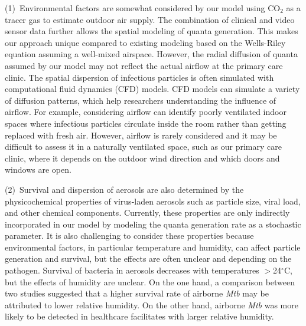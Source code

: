 \documentclass[fleqn,11pt]{wlscirep}
\begin{document}
(1)~Environmental factors are somewhat considered by our model using CO$_2$ as a tracer gas to estimate outdoor air supply. The combination of clinical and video sensor data further allows the spatial modeling of quanta generation. This makes our approach unique compared to existing modeling based on the Wells-Riley equation assuming a well-mixed airspace\cite{Riley1978AJE,Rudnick2003IndoorAir}. However, the radial diffusion of quanta assumed by our model may not reflect the actual airflow at the primary care clinic. The spatial dispersion of infectious particles is often simulated with computational fluid dynamics (CFD) models\cite{Vuorinen2020SafSci,Jung2021InfectChemo,Li2021BuildEnv}. CFD models can simulate a variety of diffusion patterns, which help researchers understanding the influence of airflow. For example, considering airflow can identify poorly ventilated indoor spaces where infectious particles circulate inside the room rather than getting replaced with fresh air\cite{Li2021BuildEnv}. However, airflow is rarely considered and it may be difficult to assess it in a naturally ventilated space, such as our primary care clinic, where it depends on the outdoor wind direction and which doors and windows are open. 

(2)~Survival and dispersion of aerosols are also determined by the physicochemical properties of virus-laden aerosols such as particle size, viral load, and other chemical components\cite{Wang2021Science}. Currently, these properties are only indirectly incorporated in our model by modeling the quanta generation rate as a stochastic parameter. It is also challenging to consider these properties because environmental factors, in particular temperature and humidity, can affect particle generation and survival, but the effects are often unclear and depending on the pathogen\cite{Songer1967,Chan2011AdvVir,Fernstrom2013JoP,Cox1995Book,Fernstrom2013JoP,Tang2009Interface}. Survival of bacteria in aerosols decreases with temperatures $>$24$^{\circ}$C, but the effects of humidity are unclear\cite{Tang2009Interface}. On the one hand, a comparison between two studies suggested that a higher survival rate of airborne \emph{Mtb} may be attributed to lower relative humidity\cite{Loudon1969AMRRD,Lever2000LettersAppliedMicrobio}. On the other hand, airborne \emph{Mtb} was more likely to be detected in healthcare facilitates with larger relative humidity\cite{Sornboot2019IJTLD,Matuka2021IJERP}.   
\end{document}
